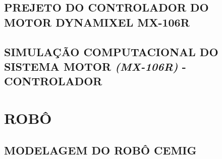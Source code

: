 \documentclass[12pt,oneside,a4paper, chapter=TITLE, section = TITLE, english, brazil]{abntex2}
\begin{document}

\subsection{PREJETO DO CONTROLADOR DO MOTOR DYNAMIXEL MX-106R}




\subsection{SIMULAÇÃO COMPUTACIONAL DO SISTEMA MOTOR \textit{(MX-106R)} - CONTROLADOR}



\section{ROBÔ} \label{sec:rob_cemig}


\subsection{MODELAGEM DO ROBÔ CEMIG}
\end{document}
